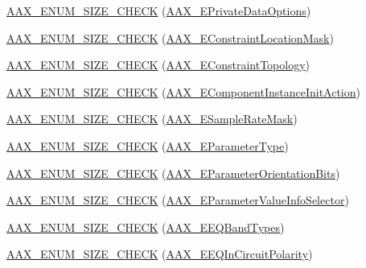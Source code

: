 \begin{DoxyCompactItemize}
\hyperlink{a00206_a1639885b25e8435d1db62b0cd22b86ad}{A\+A\+X\+\_\+\+E\+N\+U\+M\+\_\+\+S\+I\+Z\+E\+\_\+\+C\+H\+E\+C\+K} (\hyperlink{a00206_a9f1ef2cb64daf30eaf145dfbb8cd0d00}{A\+A\+X\+\_\+\+E\+Private\+Data\+Options})
\item 
\hyperlink{a00206_a2ff5fb83d7debdbae7b3649bf560740c}{A\+A\+X\+\_\+\+E\+N\+U\+M\+\_\+\+S\+I\+Z\+E\+\_\+\+C\+H\+E\+C\+K} (\hyperlink{a00206_a0c5d795c1fd021c5b9b541febc34601a}{A\+A\+X\+\_\+\+E\+Constraint\+Location\+Mask})
\item 
\hyperlink{a00206_a05ccc55cd7c2955a742a5fd17ee00156}{A\+A\+X\+\_\+\+E\+N\+U\+M\+\_\+\+S\+I\+Z\+E\+\_\+\+C\+H\+E\+C\+K} (\hyperlink{a00206_a714f56a9b0ab98a3a5365760adf77624}{A\+A\+X\+\_\+\+E\+Constraint\+Topology})
\item 
\hyperlink{a00206_a4f9ac7c5d47f389146081919b8f3e325}{A\+A\+X\+\_\+\+E\+N\+U\+M\+\_\+\+S\+I\+Z\+E\+\_\+\+C\+H\+E\+C\+K} (\hyperlink{a00206_aff5646376a3c93f032cf2400e0885023}{A\+A\+X\+\_\+\+E\+Component\+Instance\+Init\+Action})
\item 
\hyperlink{a00206_a0bed981d3c56de4cd94ea79013fbe173}{A\+A\+X\+\_\+\+E\+N\+U\+M\+\_\+\+S\+I\+Z\+E\+\_\+\+C\+H\+E\+C\+K} (\hyperlink{a00206_a5bb98259de21d2c4d04a2d6010d757c7}{A\+A\+X\+\_\+\+E\+Sample\+Rate\+Mask})
\item 
\hyperlink{a00206_aca817380286bce284343e38d3757ec30}{A\+A\+X\+\_\+\+E\+N\+U\+M\+\_\+\+S\+I\+Z\+E\+\_\+\+C\+H\+E\+C\+K} (\hyperlink{a00206_a4cd0f189daa9a60cf36883c56344bb2e}{A\+A\+X\+\_\+\+E\+Parameter\+Type})
\item 
\hyperlink{a00206_a8354d2be741861f15c2553345a9d33bf}{A\+A\+X\+\_\+\+E\+N\+U\+M\+\_\+\+S\+I\+Z\+E\+\_\+\+C\+H\+E\+C\+K} (\hyperlink{a00206_aa5ffa1ed828630b6b7a13c049d93ae87}{A\+A\+X\+\_\+\+E\+Parameter\+Orientation\+Bits})
\item 
\hyperlink{a00206_ac2d84d9b4dbf8606eb764cb643b1aa97}{A\+A\+X\+\_\+\+E\+N\+U\+M\+\_\+\+S\+I\+Z\+E\+\_\+\+C\+H\+E\+C\+K} (\hyperlink{a00206_aa169208a2ce713fa021e20deb2eaf608}{A\+A\+X\+\_\+\+E\+Parameter\+Value\+Info\+Selector})
\item 
\hyperlink{a00206_a092e4083784be1310fd77288d9667c0b}{A\+A\+X\+\_\+\+E\+N\+U\+M\+\_\+\+S\+I\+Z\+E\+\_\+\+C\+H\+E\+C\+K} (\hyperlink{a00206_a9ec6da28e827496514bd15d6f2b26d95}{A\+A\+X\+\_\+\+E\+E\+Q\+Band\+Types})
\item 
\hyperlink{a00206_a86e29bfb97bc412a8cc646a33bee5820}{A\+A\+X\+\_\+\+E\+N\+U\+M\+\_\+\+S\+I\+Z\+E\+\_\+\+C\+H\+E\+C\+K} (\hyperlink{a00206_ab5bda96f09874705e9b800d1b1495b48}{A\+A\+X\+\_\+\+E\+E\+Q\+In\+Circuit\+Polarity})

\end{DoxyCompactItemize}
